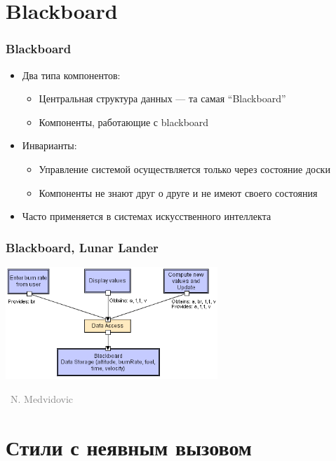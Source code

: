 \documentclass[xetex,mathserif,serif]{beamer}
\newcommand{\attribution}[1] {
    \vspace{-5mm}\begin{flushright}\begin{scriptsize}\textcolor{gray}{\textcopyright\, #1}\end{scriptsize}\end{flushright}
}
\begin{document}
    \section{Blackboard}

    \begin{frame}
        \frametitle{Blackboard}
        \begin{itemize}
            \item Два типа компонентов:
            \begin{itemize}
                \item Центральная структура данных --- та самая ``Blackboard''
                \item Компоненты, работающие с blackboard
            \end{itemize}
            \item Инварианты:
            \begin{itemize}
                \item Управление системой осуществляется только через состояние доски
                \item Компоненты не знают друг о друге и не имеют своего состояния
            \end{itemize}
            \item Часто применяется в системах искусственного интеллекта
        \end{itemize}
    \end{frame}

    \begin{frame}
        \frametitle{Blackboard, Lunar Lander}
        \begin{center}
            \includegraphics[width=0.6\textwidth]{blackboardLL.png}
            \attribution{N. Medvidovic}
        \end{center}
    \end{frame}

    \section{Стили с неявным вызовом}
\end{document}
